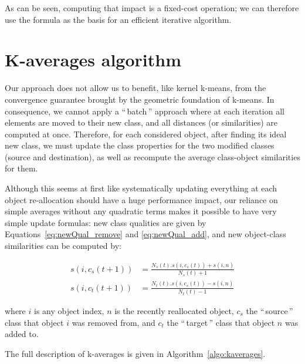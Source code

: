 \documentclass[a4paper,twoside]{article}
\newcommand{\gl}[1]{``\,#1\,''} %
\begin{document}
As can be seen, computing that impact is a fixed-cost operation; we can therefore use the formula as the basis for an efficient iterative algorithm.

\section{K-averages algorithm}
\label{sec:algo}

Our approach does not allow us to benefit, like kernel k-means, from the convergence guarantee brought by the geometric foundation of k-means. In consequence, we cannot apply a \gl{batch} approach where at each iteration all elements are moved to their new class, and all distances (or similarities) are computed at once. Therefore, for each considered object, after finding its ideal new class, we must update the class properties for the two modified classes (source and destination), as well as recompute the average class-object similarities for them.

Although this seems at first like systematically updating everything at each object re-allocation should have a huge performance impact, our reliance on simple averages without any quadratic terms makes it possible to have very simple update formulas: new class qualities are given by Equations~\ref{eq:newQual_remove} and \ref{eq:newQual_add}, and new object-class similarities can be computed by:

\begin{equation}
	\begin{aligned}
    s(i, c_s(t+1)) &= \frac{N_s(t).s(i, c_s(t)) + s(i,n)}{N_s(t)+1} \\
    s(i, c_t(t+1)) &= \frac{N_t(t).s(i, c_s(t)) - s(i,n)}{N_t(t)-1}
   	\end{aligned}
  \label{eq:newSimilNewC}
\end{equation}

where $i$ is any object index, $n$ is the recently reallocated object, $c_s$ the \gl{source} class that object $i$ was removed from, and $c_t$ the \gl{target} class that object $n$ was added to.

The full description of k-averages is given in Algorithm~\ref{algo:kaverages}.
\end{document}

